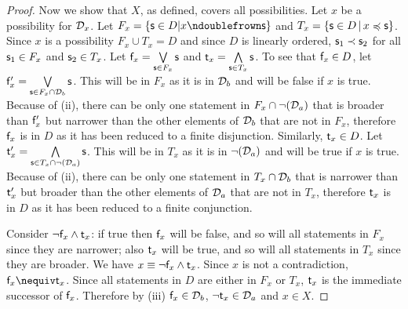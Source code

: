 \documentclass[11pt,letterpaper,fleqn]{memoir} %
\begin{document}
\begin{mathSection}
\begin{proof}
	Now we show that $X$, as defined, covers all possibilities. Let $x$ be a possibility for $\edomain_x$. Let $F_x=\{\stmt \in D| x \ncomp \stmt \}$ and $T_x=\{\stmt \in D \, | \, x \narrower \stmt \}$. Since $x$ is a possibility $F_x \cup T_x = D$ and since $D$ is linearly ordered, $\stmt_1 \snarrower \stmt_2$ for all $\stmt_1 \in F_x$ and $\stmt_2 \in T_x$. Let $\stmt[f]_x = \bigOR\limits_{\stmt \in F_x} \stmt$ and $\stmt[t]_x = \bigAND\limits_{\stmt \in T_x} \stmt$. To see that $\stmt[f]_x \in D$, let $\stmt[f]'_x = \bigOR\limits_{\stmt \in F_x\cap\edomain_b} \stmt$. This will be in $F_x$ as it is in $\edomain_b$ and will be false if $x$ is true. Because of (ii), there can be only one statement in $F_x \cap \NOT(\edomain_a)$ that is broader than $\stmt[f]'_x$ but narrower than the other elements of $\edomain_b$ that are not in $F_x$, therefore $\stmt[f]_x$ is in $D$ as it has been reduced to a finite disjunction. Similarly, $\stmt[t]_x \in D$. Let $\stmt[t]'_x = \bigAND\limits_{\stmt \in T_x\cap \NOT(\edomain_a)} \stmt$. This will be in $T_x$ as it is in $\NOT (\edomain_a)$ and will be true if $x$ is true. Because of (ii), there can be only one statement in $T_x \cap \edomain_b$ that is narrower than $\stmt[t]'_x$ but broader than the other elements of $\edomain_a$ that are not in $T_x$, therefore $\stmt[t]_x$ is in $D$ as it has been reduced to a finite conjunction.
	
	Consider $\NOT \stmt[f]_x \AND \stmt[t]_x$: if true then $\stmt[f]_x$ will be false, and so will all statements in $F_x$ since they are narrower; also $\stmt[t]_x$ will be true, and so will all statements in $T_x$ since they are broader. We have $x \equiv \NOT \stmt[f]_x \AND \stmt[t]_x$. Since $x$ is not a contradiction, $\stmt[f]_x \nequiv \stmt[t]_x$. Since all statements in $D$ are either in $F_x$ or $T_x$, $\stmt[t]_x$ is the immediate successor of $\stmt[f]_x$. Therefore by (iii) $\stmt[f]_x \in \edomain_b$,  $\NOT \stmt[t]_x \in \edomain_a$ and $x \in X$.


\end{proof}
\end{mathSection}
\end{document}
